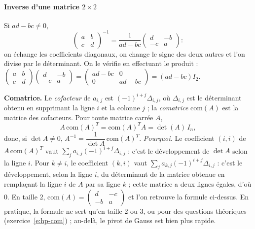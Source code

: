\documentclass[a4paper,11pt]{article}
\numberwithin{equation}{section}
\numberwithin{figure}{section}
\numberwithin{table}{section}
\theoremstyle{enonce}
\theoremstyle{exemple}
\theoremstyle{remarque}
\begin{document}
\paragraph{Inverse d'une matrice $2\times2$} Si $ad-bc\neq0$,
\[\begin{pmatrix}a&b\\c&d\end{pmatrix}^{-1}=\frac1{ad-bc}\begin{pmatrix}d&-b\\-c&a\end{pmatrix} :\]
on échange les coefficients diagonaux, on change le signe des deux autres et l'on divise par le déterminant. On le
vérifie en effectuant le produit : $\begin{pmatrix}a&b\\c&d\end{pmatrix}\begin{pmatrix}d&-b\\-c&a\end{pmatrix}
=\begin{pmatrix}ad-bc&0\\0&ad-bc\end{pmatrix}=(ad-bc)I_2$.

\begin{horsprogramme}\label{hp:comatrice}
\textbf{Comatrice.} Le \emph{cofacteur} de $a_{i,j}$ est $(-1)^{i+j}\Delta_{i,j}$, où $\Delta_{i,j}$ est le déterminant
obtenu en supprimant la ligne $i$ et la colonne $j$ ; la \emph{comatrice} $\mathrm{com}(A)$ est la matrice des cofacteurs. Pour
toute matrice carrée $A$,
\[A\,\mathrm{com}(A)^T=\mathrm{com}(A)^T A=\det(A)\,I_n,\]
donc, si $\det A\neq0$, $A^{-1}=\dfrac1{\det A}\,\mathrm{com}(A)^T$.
\emph{Pourquoi.} Le coefficient $(i,i)$ de $A\,\mathrm{com}(A)^T$ vaut $\sum_ja_{i,j}(-1)^{i+j}\Delta_{i,j}$ : c'est le
développement de $\det A$ selon la ligne $i$. Pour $k\neq i$, le coefficient $(k,i)$ vaut
$\sum_ja_{k,j}(-1)^{i+j}\Delta_{i,j}$ : c'est le développement, selon la ligne $i$, du déterminant de la matrice obtenue
en remplaçant la ligne $i$ de $A$ par sa ligne $k$ ; cette matrice a deux lignes égales, d'où $0$.
En taille $2$, $\mathrm{com}(A)=\begin{pmatrix}d&-c\\-b&a\end{pmatrix}$ et l'on retrouve la formule ci-dessus. En
pratique, la formule ne sert qu'en taille $2$ ou $3$, ou pour des questions théoriques (exercice~\ref{e:hp-com}) ; au-delà,
le pivot de Gauss est bien plus rapide.
\end{horsprogramme}
\end{document}
